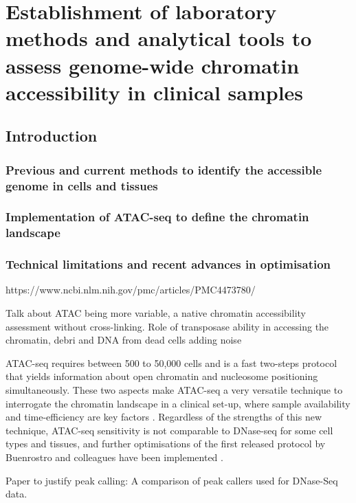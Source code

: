 \chapter{Establishment of laboratory methods and analytical tools to assess genome-wide chromatin accessibility in clinical samples}
\label{ch:Results1}


\section{Introduction}
\subsection*{Previous and current methods to identify the accessible genome in cells and tissues}

\subsection*{Implementation of ATAC-seq to define the chromatin landscape}

\subsection*{Technical limitations and recent advances in optimisation}
https://www.ncbi.nlm.nih.gov/pmc/articles/PMC4473780/

Talk about ATAC being more variable, a native chromatin accessibility assessment without cross-linking. Role of transposase ability in accessing the chromatin, debri and DNA from dead cells adding noise

ATAC-seq requires between 500 to 50,000 cells and is a fast two-steps protocol that yields information about open chromatin and nucleosome positioning simultaneously. 
These two aspects make ATAC-seq a very versatile technique to interrogate the chromatin landscape in a clinical set-up, where sample availability and time-efficiency are key factors \parencite{Scharer2016,Qu2015,Qu2017}. Regardless of the strengths of this new technique, ATAC-seq sensitivity is not comparable to DNase-seq for some cell types and tissues, and further optimisations of the first released protocol by Buenrostro and colleagues have been implemented \parencite{Corces2016,Sos2016,Corces2017}. 


Paper to justify peak calling: A comparison of peak callers used for DNase-Seq data.

